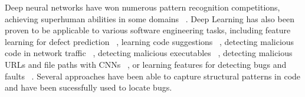 \documentclass[
	a4paper,
	pagesize,
	pdftex,
	12pt,
	twoside, %
	BCOR=5mm, %
	ngerman,
	fleqn,
	final,
	]{scrartcl}
\begin{document}
Deep neural networks have won numerous pattern recognition competitions, achieving superhuman abilities in some domains ~\cite{Schmidhuber.2015}. Deep Learning has also been proven to be applicable to various software engineering tasks, including feature learning for defect prediction ~\cite{Wang.2016}, learning code suggestions ~\cite{Bhoopchand.2016}, detecting malicious code in network traffic ~\cite{Elovici.2007}, detecting malicious executables ~\cite{Schultz.2000}, detecting malicious URLs and file paths with CNNs ~\cite{Saxe.2017}, or learning features for detecting bugs and faults ~\cite{Huo.2016,Gupta.2017b}. Several approaches have been able to capture structural patterns in code \cite{Dam.2016} and have been sucessfully used to locate bugs\cite{Huo.2016,Russell.2018}.\\
\end{document}
